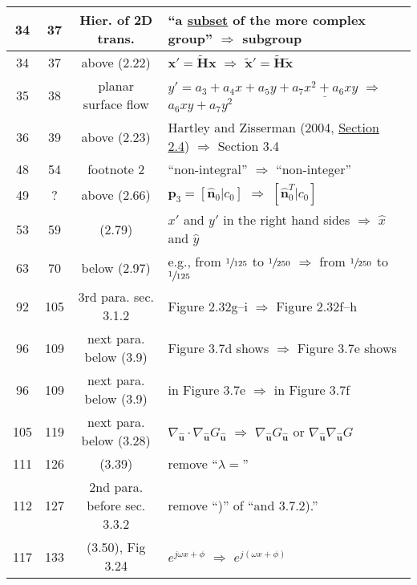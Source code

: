 \documentclass[10pt]{article}
\begin{document}
\begin{tabular}{|c|c|c|l|}
34 & 37 & Hier. of 2D trans. & ``a \underline{subset} of the more complex group'' $\Rightarrow$ subgroup \\\hline
34 & 37 & above (2.22) & $\boldsymbol{x}' = \tilde{\boldsymbol{H}} \boldsymbol{x}$ $\Rightarrow$ $\tilde{\boldsymbol{x}}' = \tilde{\boldsymbol{H}} \tilde{\boldsymbol{x}}$ \\\hline 
35 & 38 & planar surface flow & $y' = a_3 + a_4 x + a_5 y + \underline{a_7 x^2 + a_6 xy}$ $\Rightarrow$  $a_6 xy + a_7 y^2$ \\\hline
36 & 39 & above (2.23) & Hartley and Zisserman (2004, \underline{Section 2.4}) $\Rightarrow$  Section 3.4 \\\hline
48 & 54 & footnote 2 & ``non-integral'' $\Rightarrow$ ``non-integer'' \\\hline
49 & ? & above (2.66) & $\boldsymbol{p}_3 = [\boldsymbol{\hat{n}}_0 | c_0]$ $\Rightarrow$ $[\boldsymbol{\hat{n}}_0^T| c_0]$ \\\hline
53 & 59 & (2.79) & $x'$ and $y'$ in the right hand sides $\Rightarrow$ $\hat{x}$ and $\hat{y}$ \\\hline
63 & 70 & below (2.97) & e.g., from $\sfrac{1}{125}$ to $\sfrac{1}{250}$ $\Rightarrow$ from $\sfrac{1}{250}$ to $\sfrac{1}{125}$ \\\hline
92   & 105 & 3rd para. sec. 3.1.2 & Figure 2.32g--i $\Rightarrow$ Figure 2.32f--h \\\hline
96   & 109 & next para. below (3.9) & Figure 3.7d shows $\Rightarrow$  Figure 3.7e shows \\\hline
96   & 109 & next para. below (3.9) & in Figure 3.7e $\Rightarrow$ in Figure 3.7f \\\hline
105 & 119 & next para. below (3.28) & $\nabla_{{\mbox{$\boldsymbol{\hat{u}}$}}} \cdot \nabla_{{\mbox{$\boldsymbol{\hat{u}}$}}} G_{{\mbox{$\boldsymbol{\hat{u}}$}}}$
       $\Rightarrow$ 
       $\nabla_{{\mbox{$\boldsymbol{\hat{u}}$}}} G_{{\mbox{$\boldsymbol{\hat{u}}$}}}$
       or
       $\nabla_{{\mbox{$\boldsymbol{\hat{u}}$}}} \nabla_{{\mbox{$\boldsymbol{\hat{u}}$}}} G$
        \\\hline
111 & 126 & (3.39) & remove ``$\lambda = $'' \\\hline
112 & 127 & 2nd para. before sec. 3.3.2 & remove ``)'' of ``and 3.7.2).'' \\\hline
117 & 133 & (3.50), Fig 3.24 & $e^{j \omega x + \phi}$ $\Rightarrow$ $e^{j (\omega x + \phi)}$ \\\hline

\end{tabular}
\end{document}
